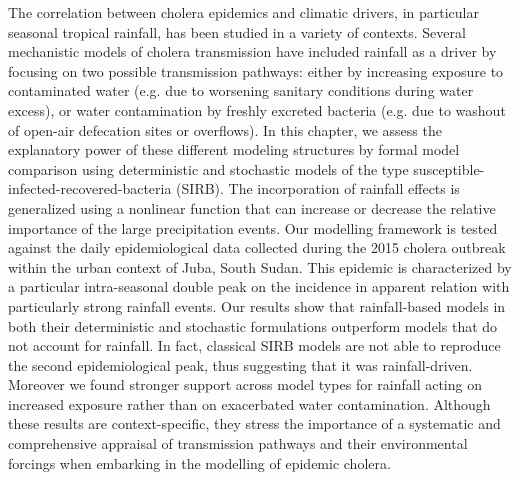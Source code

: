 \begin{fullwidth}
The correlation between cholera epidemics and climatic drivers, in particular seasonal tropical rainfall, has been studied in a variety of contexts. Several mechanistic models of cholera transmission have included rainfall as a driver by focusing on two possible transmission pathways: either by increasing exposure to contaminated water (e.g. due to worsening sanitary conditions during water excess), or water contamination by freshly excreted bacteria (e.g. due to washout of open-air defecation sites or overflows). In this chapter, we assess the explanatory power of these different modeling structures by formal model comparison using deterministic and stochastic models of the type susceptible-infected-recovered-bacteria (SIRB). The incorporation of rainfall effects is generalized using a nonlinear function that can increase or decrease the relative importance of the large precipitation events. Our modelling framework is tested against the daily epidemiological data collected during the 2015 cholera outbreak within the urban context of Juba, South Sudan. This epidemic is characterized by a particular intra-seasonal double peak on the incidence in apparent relation with particularly strong rainfall events. Our results show that rainfall-based models in both their deterministic and stochastic formulations outperform models that do not account for rainfall. In fact, classical SIRB models are not able to reproduce the second epidemiological peak, thus suggesting that it was rainfall-driven. Moreover we found stronger support across model types for rainfall acting on increased exposure rather than on exacerbated water contamination. Although these results are context-specific, they stress the importance of a systematic and comprehensive appraisal of transmission pathways and their environmental forcings when embarking in the modelling of epidemic cholera.
\end{fullwidth}

